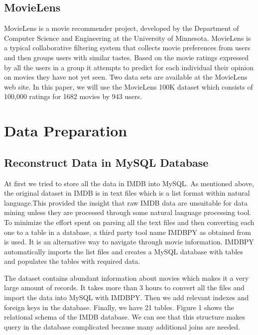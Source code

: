 \documentclass[conference]{IEEEtran}
\begin{document}
\subsection{MovieLens}
MovieLens is a movie recommender project, developed by the Department of Computer Science and Engineering at the University of Minnesota. MovieLens is a typical collaborative filtering system that collects movie preferences from users and then groups users with similar tastes. Based on the movie ratings expressed by all the users in a group it attempts to predict for each individual their opinion on movies they have not yet seen. Two data sets are available at the MovieLens web site\cite{movielens}. In this paper, we will use the MovieLens 100K dataset which consists of 100,000 ratings for 1682 movies by 943 users.


\section{Data Preparation}

\subsection{Reconstruct Data in MySQL Database}
At first we tried to store all the data in IMDB into MySQL. As mentioned above, the original dataset in IMDB is in text files which is a list format within natural language.This provided the insight that raw IMDB data are unsuitable for data mining unless they are processed through some natural language processing tool. To minimize the effort spent on parsing all the text files and then converting each one to a table in a database, a third party tool name IMDBPY as obtained from\cite{imdbpy} is used. It is an alternative way to navigate through movie information. IMDBPY automatically imports the list files and creates a MySQL database with tables and populates the tables with required data. 

The dataset contains abundant information about movies which makes it a very large amount of records. It takes more than 3 hours to convert all the files and import the data into MySQL with IMDBPY. Then we add relevant indexes and foreign keys in the database. Finally, we have 21 tables. Figure 1 shows the relational schema of the IMDB database. We can see that this structure makes query in the database complicated because many additional joins are needed.
\end{document}
